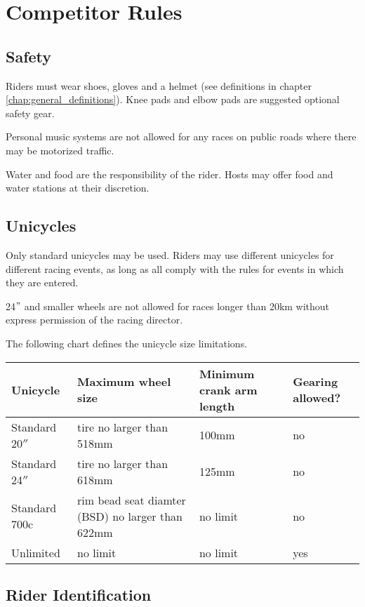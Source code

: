 \chapter{Competitor Rules}

\section{Safety}
Riders must wear shoes, gloves and a helmet (see definitions in chapter \ref{chap:general_definitions}).
Knee pads and elbow pads are suggested optional safety gear.

Personal music systems are not allowed for any races on public roads where there may be motorized traffic.

Water and food are the responsibility of the rider. Hosts may offer food and water stations at their discretion.

\section{Unicycles}

Only standard unicycles may be used.
Riders may use different unicycles for different racing events, as long as all comply with the rules for events in which they are entered.

24$"$ and smaller wheels are not allowed for races longer than 20km without express permission of the racing director.

The following chart defines the unicycle size limitations.
\begin{longtable}{|p{3cm}|p{5cm}|p{2cm}|p{2cm}|}
\hline
\textbf{Unicycle} & \textbf{Maximum wheel size} & \textbf{Minimum crank arm length} & \textbf{Gearing allowed?}\\
\hline
Standard 20$''$ & tire no larger than 518mm & 100mm & no \\
\hline
Standard 24$''$ & tire no larger than 618mm & 125mm & no \\
\hline
Standard 700c & rim bead seat diamter (BSD) no larger than 622mm & no limit & no \\
\hline
Unlimited & no limit & no limit & yes \\
\hline
\end{longtable}

\section{Rider Identification}

